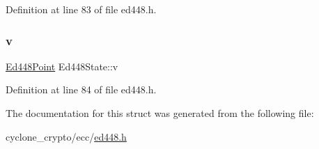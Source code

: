 Definition at line 83 of file ed448.\+h.

\mbox{\label{structEd448State_ae1caad09bcd6c049bdd8e32f11e181b0}} 
\subsubsection{\texorpdfstring{v}{v}}
{\footnotesize\ttfamily \hyperlink{structEd448Point}{Ed448\+Point} Ed448\+State\+::v}



Definition at line 84 of file ed448.\+h.



The documentation for this struct was generated from the following file\+:\begin{DoxyCompactItemize}
\item 
cyclone\+\_\+crypto/ecc/\hyperlink{ed448_8h}{ed448.\+h}\end{DoxyCompactItemize}
